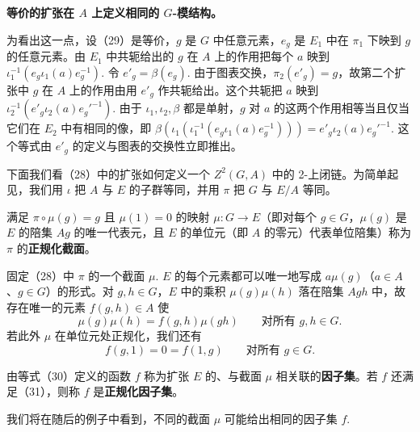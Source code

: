 \noindent\textbf{等价的扩张在 \(A\) 上定义相同的 \(G\)-模结构。}

为看出这一点，设（29）是等价，\(g\) 是 \(G\) 中任意元素，\(e_g\) 是 \(E_1\) 中在 \(\pi_1\) 下映到 \(g\) 的任意元素。由 \(E_1\) 中共轭给出的 \(g\) 在 \(A\) 上的作用把每个 \(a\) 映到 \(\iota_1^{-1}(e_g\iota_1(a)e_g^{-1})\). 令 \(e'_g = \beta(e_g)\). 由于图表交换，\(\pi_2(e'_g) = g\)，故第二个扩张中 \(g\) 在 \(A\) 上的作用由用 \(e'_g\) 作共轭给出。这个共轭把 \(a\) 映到 \(\iota_2^{-1}(e'_g\iota_2(a)e_g'^{-1})\). 由于 \(\iota_1, \iota_2, \beta\) 都是单射，\(g\) 对 \(a\) 的这两个作用相等当且仅当它们在 \(E_2\) 中有相同的像，即 \(\beta(\iota_1(\iota_1^{-1}(e_g\iota_1(a)e_g^{-1}))) = e'_g\iota_2(a)e_g'^{-1}\). 这个等式由 \(e'_g\) 的定义与图表的交换性立即推出。

下面我们看（28）中的扩张如何定义一个 \(Z^2(G, A)\) 中的 2-上闭链。为简单起见，我们用 \(\iota\) 把 \(A\) 与 \(E\) 的子群等同，并用 \(\pi\) 把 \(G\) 与 \(E/A\) 等同。

\begin{definition}
满足 \(\pi \circ \mu(g) = g\) 且 \(\mu(1) = 0\) 的映射 \(\mu : G \to E\)（即对每个 \(g \in G\)，\(\mu(g)\) 是 \(E\) 的陪集 \(Ag\) 的唯一代表元，且 \(E\) 的单位元（即 \(A\) 的零元）代表单位陪集）称为 \(\pi\) 的\textbf{正规化截面}。
\end{definition}

固定（28）中 \(\pi\) 的一个截面 \(\mu\). \(E\) 的每个元素都可以唯一地写成 \(a\mu(g)\)（\(a \in A\)、\(g \in G\)）的形式。对 \(g, h \in G\)，\(E\) 中的乘积 \(\mu(g)\mu(h)\) 落在陪集 \(Agh\) 中，故存在唯一的元素 \(f(g,h) \in A\) 使
\[
\mu(g)\mu(h) = f(g,h)\mu(gh) \qquad \text{对所有 } g, h \in G. \tag{17.30}
\]
若此外 \(\mu\) 在单位元处正规化，我们还有
\[
f(g, 1) = 0 = f(1, g) \qquad \text{对所有 } g \in G. \tag{17.31}
\]

\begin{definition}
由等式（30）定义的函数 \(f\) 称为扩张 \(E\) 的、与截面 \(\mu\) 相关联的\textbf{因子集}。若 \(f\) 还满足（31），则称 \(f\) 是\textbf{正规化因子集}。
\end{definition}

我们将在随后的例子中看到，不同的截面 \(\mu\) 可能给出相同的因子集 \(f\).


